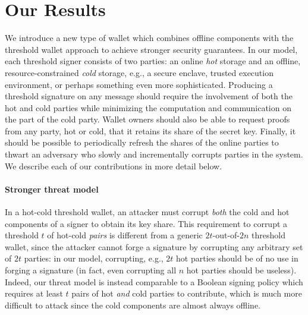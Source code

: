 \section{Our Results}

We introduce a new type of wallet which combines offline components with the threshold wallet approach to achieve stronger security guarantees. In our model, each threshold signer consists of two parties: an online \emph{hot} storage and an offline, resource-constrained \emph{cold} storage, e.g., a secure enclave, trusted execution environment, or perhaps something even more sophisticated.  Producing a threshold signature on any message should require the involvement of both the hot and cold parties while minimizing the computation and communication on the part of the cold party. Wallet owners should also be able to request proofs from any party, hot or cold, that it retains its share of the secret key. Finally, it should be possible to periodically refresh the shares of the online parties to thwart an adversary who slowly and incrementally corrupts parties in the system. We describe each of our contributions in more detail below.

\paragraph{Stronger threat model}
In a hot-cold threshold wallet, an attacker must corrupt \emph{both} the cold and hot components of a signer to obtain its key share.
This requirement to corrupt a threshold $t$ of hot-cold \emph{pairs} is different from a generic $2t$-out-of-$2n$ threshold wallet, since the attacker cannot forge a signature by corrupting any arbitrary set of $2t$ parties: in our model, corrupting, e.g., $2t$ hot parties should be of no use in forging a signature (in fact, even corrupting all $n$ hot parties should be useless). Indeed, our threat model is instead comparable to a Boolean signing policy which requires at least $t$ pairs of hot \emph{and} cold parties to contribute, which is much more difficult to attack since the cold components are almost always offline. %


